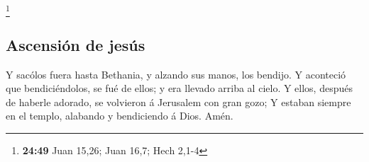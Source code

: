 \footnote{\textbf{24:49} Juan 15,26; Juan 16,7; Hech 2,1-4}

\hypertarget{ascensiuxf3n-de-jesuxfas}{%
\subsection{Ascensión de jesús}\label{ascensiuxf3n-de-jesuxfas}}

 Y sacólos fuera hasta Bethania, y alzando sus manos, los
bendijo.  Y aconteció que bendiciéndolos, se fué de
ellos; y era llevado arriba al cielo.  Y ellos, después
de haberle adorado, se volvieron á Jerusalem con gran gozo;
 Y estaban siempre en el templo, alabando y bendiciendo á
Dios. Amén.
